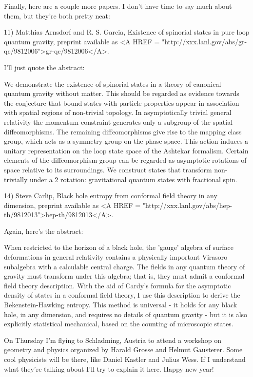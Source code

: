 Finally, here are a couple more papers.  I don't have time to say much 
about them, but they're both pretty neat:

11) Matthias Arnsdorf and R. S. Garcia, Existence of spinorial states in
pure loop quantum gravity, preprint available as <A HREF = "http://xxx.lanl.gov/abs/gr-qc/9812006">gr-qc/9812006</A>.

I'll just quote the abstract:

     We demonstrate the existence of spinorial states in a theory of
     canonical quantum gravity without matter. This should be regarded
     as evidence towards the conjecture that bound states with particle
     properties appear in association with spatial regions of
     non-trivial topology. In asymptotically trivial general relativity
     the momentum constraint generates only a subgroup of the spatial
     diffeomorphisms. The remaining diffeomorphisms give rise to the
     mapping class group, which acts as a symmetry group on the phase
     space. This action induces a unitary representation on the loop
     state space of the Ashtekar formalism. Certain elements of the
     diffeomorphism group can be regarded as asymptotic rotations of
     space relative to its surroundings. We construct states that
     transform non-trivially under a 2 \pi  rotation: gravitational
     quantum states with fractional spin.

14) Steve Carlip, Black hole entropy from conformal field theory in any 
dimension, preprint available as 
<A HREF = "http://xxx.lanl.gov/abs/hep-th/9812013">hep-th/9812013</A>.

Again, here's the abstract:

     When restricted to the horizon of a black hole, the 'gauge'
     algebra of surface deformations in general relativity contains a
     physically important Virasoro subalgebra with a calculable central
     charge. The fields in any quantum theory of gravity must transform
     under this algebra; that is, they must admit a conformal field
     theory description. With the aid of Cardy's formula for the
     asymptotic density of states in a conformal field theory, I use
     this description to derive the Bekenstein-Hawking entropy. This method
     is universal - it holds for any black hole, in any dimension, and
     requires no details of quantum gravity - but it is also explicitly
     statistical mechanical, based on the counting of microscopic
     states.

On Thursday I'm flying to Schladming, Austria to attend a workshop on 
geometry and physics organized by Harald Grosse and Helmut Gausterer.
Some cool physicists will be there, like Daniel Kastler and Julius Wess.  
If I understand what they're talking about I'll try to explain it here.  
Happy new year!


